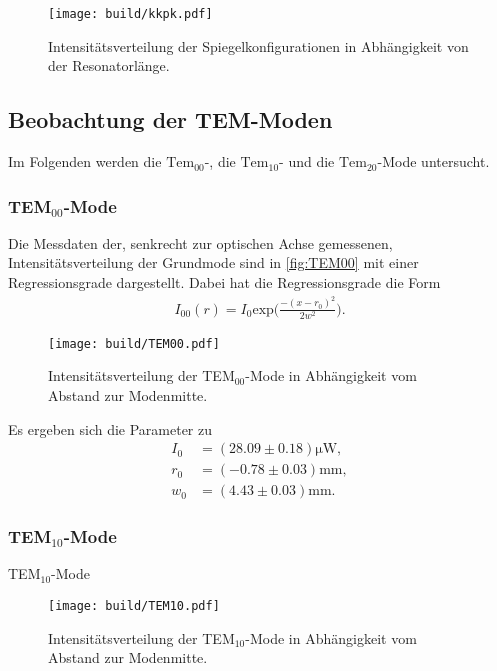 \begin{figure}[H]
  \centering
  \texttt{[image: build/kkpk.pdf]}
  \caption {Intensitätsverteilung der Spiegelkonfigurationen in Abhängigkeit von der Resonatorlänge.}
  \label{fig:kkpk}
\end{figure}

\subsection{Beobachtung der TEM-Moden}
\label{subsec:Moden_aus}
Im Folgenden werden die $\text{Tem}_{00}$-, die $\text{Tem}_{10}$- und die $\text{Tem}_{20}$-Mode untersucht.

\subsubsection{TEM$_{00}$-Mode}
\label{subsubsec:00Mode}
Die Messdaten der, senkrecht zur optischen Achse gemessenen, Intensitätsverteilung der Grundmode sind in \autoref{fig:TEM00} mit einer Regressionsgrade dargestellt.
Dabei hat die Regressionsgrade die Form
\begin{align*}
  I_{00}(r) = I_0 \text{exp}\Biggl(\frac{-(x-r_0)^2}{2 w^2}\Biggr).
\end{align*}

\begin{figure}[H]
  \centering
  \texttt{[image: build/TEM00.pdf]}
  \caption {Intensitätsverteilung der TEM$_{00}$-Mode in Abhängigkeit vom Abstand zur Modenmitte.}
  \label{fig:TEM00}
\end{figure}

Es ergeben sich die Parameter zu
\begin{align*}
  I_{0} &= (28.09 \pm 0.18) \si{\micro\W},\\
  r_0 &= (-0.78 \pm 0.03) \si{\milli\meter},\\
  w_0 &= (4.43 \pm 0.03) \si{\milli\meter}.
\end{align*}


\subsubsection{TEM$_{10}$-Mode}
\label{subsubsec:10Mode}

TEM$_{10}$-Mode

\begin{figure}[H]
  \centering
  \texttt{[image: build/TEM10.pdf]}
  \caption {Intensitätsverteilung der TEM$_{10}$-Mode in Abhängigkeit vom Abstand zur Modenmitte.}
  \label{fig:TEM10}
\end{figure}

